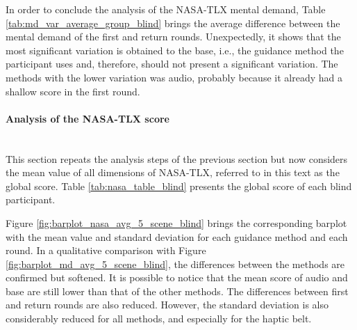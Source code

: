 

In order to conclude the analysis of the NASA-TLX mental demand, Table \ref{tab:md_var_average_group_blind} brings the average difference between the mental demand of the first and return rounds. Unexpectedly, it shows that the most significant variation is obtained to the base, i.e., the guidance method the participant uses and, therefore, should not present a significant variation. The methods with the lower variation was audio, probably because it already had a shallow score in the first round. 



\FloatBarrier



\paragraph{Analysis of the NASA-TLX score}\mbox{}\\

This section repeats the analysis steps of the previous section but now considers the mean value of all dimensions of NASA-TLX, referred to in this text as the global score. Table \ref{tab:nasa_table_blind} presents the global score of each blind participant. 



Figure \ref{fig:barplot_nasa_avg_5_scene_blind} brings the corresponding barplot with the mean value and standard deviation for each guidance method and each round. In a qualitative comparison with Figure \ref{fig:barplot_md_avg_5_scene_blind}, the differences between the methods are confirmed but softened. It is possible to notice that the mean score of audio and base are still lower than that of the other methods. The differences between first and return rounds are also reduced. However, the standard deviation is also considerably reduced for all methods, and especially for the haptic belt.

